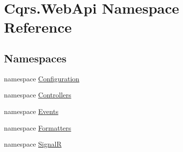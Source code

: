 \hypertarget{namespaceCqrs_1_1WebApi}{}\section{Cqrs.\+Web\+Api Namespace Reference}
\label{namespaceCqrs_1_1WebApi}
\subsection*{Namespaces}
\begin{DoxyCompactItemize}
\item 
namespace \hyperlink{namespaceCqrs_1_1WebApi_1_1Configuration}{Configuration}
\item 
namespace \hyperlink{namespaceCqrs_1_1WebApi_1_1Controllers}{Controllers}
\item 
namespace \hyperlink{namespaceCqrs_1_1WebApi_1_1Events}{Events}
\item 
namespace \hyperlink{namespaceCqrs_1_1WebApi_1_1Formatters}{Formatters}
\item 
namespace \hyperlink{namespaceCqrs_1_1WebApi_1_1SignalR}{SignalR}
\end{DoxyCompactItemize}
